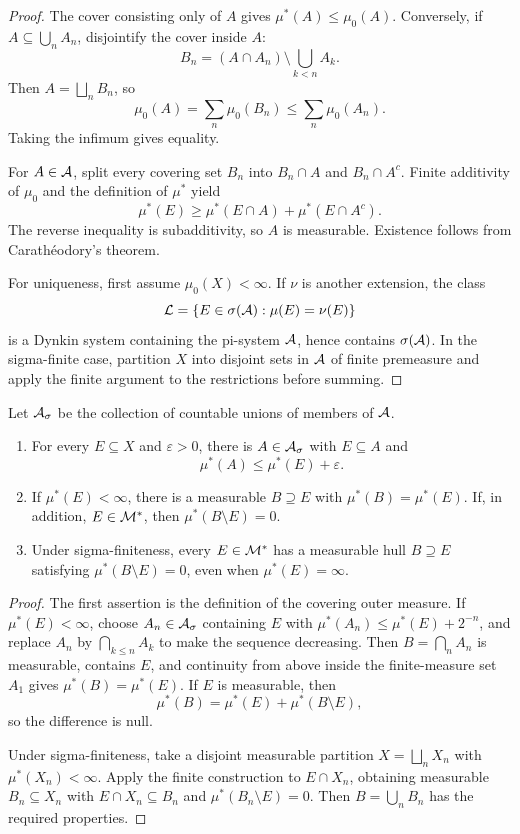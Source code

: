 \begin{proof}
The cover consisting only of $A$ gives $\mu^*(A)\leq\mu_0(A)$. Conversely, if $A\subseteq\bigcup_nA_n$, disjointify the cover inside $A$:
\[
B_n=(A\cap A_n)\setminus\bigcup_{k<n}A_k.
\]
Then $A=\bigsqcup_nB_n$, so
\[
\mu_0(A)=\sum_n\mu_0(B_n)\leq\sum_n\mu_0(A_n).
\]
Taking the infimum gives equality.

For $A\in\mathcal{A}$, split every covering set $B_n$ into $B_n\cap A$ and $B_n\cap A^c$. Finite additivity of $\mu_0$ and the definition of $\mu^*$ yield
\[
\mu^*(E)\geq\mu^*(E\cap A)+\mu^*(E\cap A^c).
\]
The reverse inequality is subadditivity, so $A$ is measurable. Existence follows from Carath\'eodory's theorem.

For uniqueness, first assume $\mu_0(X)<\infty$. If $\nu$ is another extension, the class
\[
\mathcal{L}=\{E\in\sigma(\mathcal{A}):\mu(E)=\nu(E)\}
\]
is a Dynkin system containing the pi-system $\mathcal{A}$, hence contains $\sigma(\mathcal{A})$. In the sigma-finite case, partition $X$ into disjoint sets in $\mathcal{A}$ of finite premeasure and apply the finite argument to the restrictions before summing.
\end{proof}

\begin{prop}
Let $\mathcal{A}_\sigma$ be the collection of countable unions of members of $\mathcal{A}$.
\begin{enumerate}
  \item For every $E\subseteq X$ and $\varepsilon>0$, there is $A\in\mathcal{A}_\sigma$ with $E\subseteq A$ and
  \[
  \mu^*(A)\leq\mu^*(E)+\varepsilon.
  \]
  \item If $\mu^*(E)<\infty$, there is a measurable $B\supseteq E$ with $\mu^*(B)=\mu^*(E)$. If, in addition, $E\in\mathcal{M}^*$, then $\mu^*(B\setminus E)=0$.
  \item Under sigma-finiteness, every $E\in\mathcal{M}^*$ has a measurable hull $B\supseteq E$ satisfying $\mu^*(B\setminus E)=0$, even when $\mu^*(E)=\infty$.
\end{enumerate}
\end{prop}

\begin{proof}
The first assertion is the definition of the covering outer measure. If $\mu^*(E)<\infty$, choose $A_n\in\mathcal{A}_\sigma$ containing $E$ with $\mu^*(A_n)\leq\mu^*(E)+2^{-n}$, and replace $A_n$ by $\bigcap_{k\leq n}A_k$ to make the sequence decreasing. Then $B=\bigcap_nA_n$ is measurable, contains $E$, and continuity from above inside the finite-measure set $A_1$ gives $\mu^*(B)=\mu^*(E)$. If $E$ is measurable, then
\[
\mu^*(B)=\mu^*(E)+\mu^*(B\setminus E),
\]
so the difference is null.

Under sigma-finiteness, take a disjoint measurable partition $X=\bigsqcup_nX_n$ with $\mu^*(X_n)<\infty$. Apply the finite construction to $E\cap X_n$, obtaining measurable $B_n\subseteq X_n$ with $E\cap X_n\subseteq B_n$ and $\mu^*(B_n\setminus E)=0$. Then $B=\bigcup_nB_n$ has the required properties.
\end{proof}

